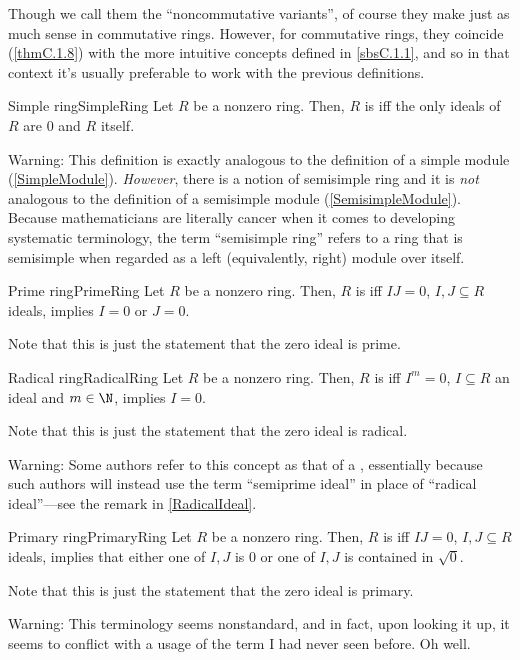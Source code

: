 Though we call them the ``noncommutative variants'', of course they make just as much sense in commutative rings.  However, for commutative rings, they coincide (\cref{thmC.1.8}) with the more intuitive concepts defined in \cref{sbsC.1.1}, and so in that context it's usually preferable to work with the previous definitions.
\begin{dfn}{Simple ring}{SimpleRing}
	Let $R$ be a nonzero ring.  Then, $R$ is  iff the only ideals of $R$ are $0$ and $R$ itself.
	\begin{rmk}
		Warning:  This definition is exactly analogous to the definition of a simple module (\cref{SimpleModule}).  \emph{However}, there is a notion of semisimple ring and it is \emph{not} analogous to the definition of a semisimple module (\cref{SemisimpleModule}).  Because mathematicians are literally cancer when it comes to developing systematic terminology, the term ``semisimple ring'' refers to a ring that is semisimple when regarded as a left (equivalently, right) module over itself.
	\end{rmk}
\end{dfn}
\begin{dfn}{Prime ring}{PrimeRing}
	Let $R$ be a nonzero ring.  Then, $R$ is  iff $IJ=0$, $I,J\subseteq R$ ideals, implies $I=0$ or $J=0$.
	\begin{rmk}
		Note that this is just the statement that the zero ideal is prime.
	\end{rmk}
\end{dfn}
\begin{dfn}{Radical ring}{RadicalRing}
	Let $R$ be a nonzero ring.  Then, $R$ is  iff $I^m=0$, $I\subseteq R$ an ideal and $m\in \N$, implies $I=0$.
	\begin{rmk}
		Note that this is just the statement that the zero ideal is radical.
	\end{rmk}
	\begin{rmk}
		Warning:  Some authors refer to this concept as that of a , essentially because such authors will instead use the term ``semiprime ideal'' in place of ``radical ideal''---see the remark in \cref{RadicalIdeal}.
	\end{rmk}
\end{dfn}
\begin{dfn}{Primary ring}{PrimaryRing}
	Let $R$ be a nonzero ring.  Then, $R$ is  iff $IJ=0$, $I,J\subseteq R$ ideals, implies that either one of $I,J$ is $0$ or one of $I,J$ is contained in $\sqrt{0}$.
	\begin{rmk}
		Note that this is just the statement that the zero ideal is primary.
	\end{rmk}
	\begin{rmk}
		Warning:  This terminology seems nonstandard, and in fact, upon looking it up, it seems to conflict with a usage of the term I had never seen before.  Oh well.
	\end{rmk}
\end{dfn}
